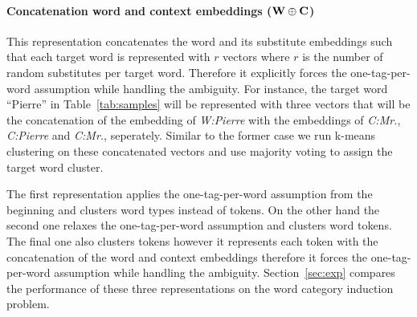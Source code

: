 \paragraph{Concatenation word and context embeddings (${\bf W\oplus C}$)} 
This representation concatenates the word and its substitute
embeddings such that each target word is represented with $r$ vectors
where $r$ is the number of random substitutes per target word.
Therefore it explicitly forces the one-tag-per-word assumption while
handling the ambiguity.  For instance, the target word ``Pierre'' in
Table~\ref{tab:samples} will be represented with three vectors that
will be the concatenation of the embedding of {\it W:Pierre} with the
embeddings of {\it C:Mr.}, {\it C:Pierre} and {\it C:Mr.}, seperately.
Similar to the former case we run k-means clustering on these
concatenated vectors and use majority voting to assign the target word
cluster.

The first representation applies the one-tag-per-word assumption from
the beginning and clusters word types instead of tokens.  On the other
hand the second one relaxes the one-tag-per-word assumption and
clusters word tokens.  The final one also clusters tokens however it
represents each token with the concatenation of the word and context
embeddings therefore it forces the one-tag-per-word assumption while
handling the ambiguity.  Section~\ref{sec:exp} compares the
performance of these three representations on the word category
induction problem.
